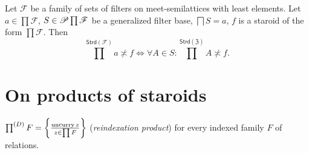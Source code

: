 \begin{conjecture}
Let $\mathscr{F}$ be a family of sets of filters on meet-semilattices
with least elements. Let $a\in\prod\mathscr{F}$, $S\in\mathscr{P}\prod\mathscr{F}$
be a generalized filter base, $\bigsqcap S=a$, $f$ is a staroid
of the form $\prod\mathscr{F}$. Then 
\[
\prod^{\mathsf{Strd}(\mathscr{F})}a\nasymp f\Leftrightarrow\forall A\in S:\prod^{\mathsf{Strd}(\mathfrak{Z})}A\nasymp f.
\]

\end{conjecture}

\section{On products of staroids}
\begin{defn}
$\prod^{(D)}F=\left\{ \frac{\operatorname{uncurry} z}{z\in\prod F}\right\}$
(\emph{reindexation product}) for every indexed family $F$ of relations.
\end{defn}

